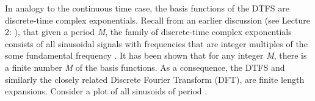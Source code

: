 \documentclass{article}
\begin{document}
\begin{CellGroup}


In analogy to the continuous time case, the basis functions of the DTFS are discrete-time complex exponentials. Recall from an earlier discussion
(see Lecture 2: ), that given a period {\itshape M}, the family of discrete-time complex exponentials
consists of all sinusoidal signals with frequencies that are integer multiples of the some fundamental frequency .
 It has been shown that for any integer {\itshape M}, there is a finite number {\itshape M} of the basis functions.  As a consequence, the DTFS and
similarly the closely related Discrete Fourier Transform (DFT), are finite length expansions. Consider a plot of all sinusoids of period .



\begin{CellGroup}

\end{CellGroup}

\end{CellGroup}
\end{document}
